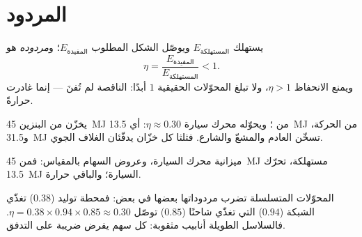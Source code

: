 \section{المردود}

\begin{definition}[المردود]\label{def:g10:energy-conservation:efficiency}
يستهلك  $E_{\text{المستهلكة}}$ ويوصّل الشكل المطلوب
$E_{\text{المفيدة}}$؛ و\emph{مردوده} هو
\[
\eta = \frac{E_{\text{المفيدة}}}{E_{\text{المستهلكة}}} < 1 .
\]
ويمنع الانحفاظ $\eta > 1$، ولا تبلغ المحوّلات الحقيقية $1$ أبدًا:
 الناقصة لم تُفنَ --- إنما غادرت حرارةً.
\end{definition}

\begin{example}\label{ex:g10:energy-conservation:engine}
يخزّن  من البنزين \qty{45}{MJ} من ؛ ويحوّله
محرك سيارة  $\eta \approx 0.30$: أي \qty{13.5}{MJ} من
الحركة، و\qty{31.5}{MJ} تسخّن العادم والمشعّ
والشارع. فثلثا كل خزّان يدفّئان الغلاف الجوي.
\end{example}

\begin{omfigure}

{\small ميزانية محرك السيارة، وعروض السهام بالمقياس: فمن
\qty{45}{MJ} مستهلكة، تحرّك \qty{13.5}{MJ} السيارة؛ والباقي حرارة.}
\end{omfigure}

\begin{remark}\label{rem:g10:energy-conservation:chain-eta}
المحوّلات المتسلسلة تضرب مردوداتها بعضها في بعض: فمحطة توليد
($0.38$) تغذّي الشبكة ($0.94$) التي تغذّي شاحنًا ($0.85$)
توصّل $\eta = 0.38 \times 0.94 \times 0.85 \approx 0.30$. فالسلاسل
الطويلة أنابيب مثقوبة: كل سهم يفرض ضريبة على التدفق.
\end{remark}

